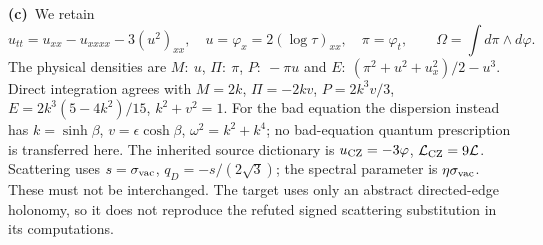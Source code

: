 \documentclass[11pt,a4paper]{article}
\newcommand{\Lc}{\textbf{(c)}\ }
\begin{document}
\Lc We retain
\[
 u_{tt}=u_{xx}-u_{xxxx}-3(u^2)_{xx},\quad u=\varphi_x=2(\log\tau)_{xx},\quad
 \pi=\varphi_t,\qquad \Omega=\int d\pi\wedge d\varphi.
\]
The physical densities are $M:\ u$, $\Pi:\ \pi$, $P:\ -\pi u$ and
$E:\ (\pi^2+u^2+u_x^2)/2-u^3$. Direct integration agrees with
$M=2k$, $\Pi=-2kv$, $P=2k^3v/3$, $E=2k^3(5-4k^2)/15$, $k^2+v^2=1$.
For the bad equation the dispersion instead has $k=\sinh\beta$,
$v=\epsilon\cosh\beta$, $\omega^2=k^2+k^4$; no bad-equation quantum
prescription is transferred here. The inherited source dictionary is
$u_{\rm CZ}=-3\varphi$, $\mathcal L_{\rm CZ}=9\mathcal L$.
Scattering uses $s=\sigma_{\rm vac}$, $q_D=-s/(2\sqrt3)$; the spectral
parameter is $\eta\sigma_{\rm vac}$. These must not be interchanged.
The target uses only an abstract directed-edge holonomy, so it does not
reproduce the refuted signed scattering substitution in its computations.
\end{document}
